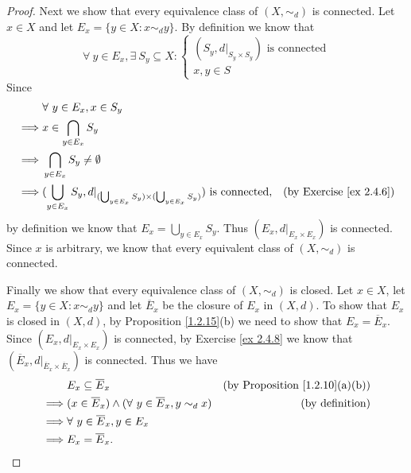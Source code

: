 \begin{proof}
    Next we show that every equivalence class of \((X, \sim_d)\) is connected.
    Let \(x \in X\) and let \(E_x = \{y \in X : x \sim_d y\}\).
    By definition we know that
    \[
        \forall\ y \in E_x, \exists\ S_y \subseteq X : \begin{cases}
            (S_y, d|_{S_y \times S_y}) \text{ is connected} \\
            x, y \in S
        \end{cases}
    \]
    Since
    \begin{align*}
                 & \forall\ y \in E_x, x \in S_y                                                                                                                          \\
        \implies & x \in \bigcap_{y \in E_x} S_y                                                                                                                          \\
        \implies & \bigcap_{y \in E_x} S_y \neq \emptyset                                                                                                                 \\
        \implies & (\bigcup_{y \in E_x} S_y, d|_{(\bigcup_{y \in E_x} S_y) \times (\bigcup_{y \in E_x} S_y)}) \text{ is connected}, & \text{(by Exercise \ref{ex 2.4.6})}
    \end{align*}
    by definition we know that \(E_x = \bigcup_{y \in E_x} S_y\).
    Thus \((E_x, d|_{E_x \times E_x})\) is connected.
    Since \(x\) is arbitrary, we know that every equivalent class of \((X, \sim_d)\) is connected.

    Finally we show that every equivalence class of \((X, \sim_d)\) is closed.
    Let \(x \in X\), let \(E_x = \{y \in X : x \sim_d y\}\) and let \(\overline{E}_x\) be the closure of \(E_x\) in \((X, d)\).
    To show that \(E_x\) is closed in \((X, d)\), by Proposition \ref{1.2.15}(b) we need to show that \(E_x = \overline{E}_x\).
    Since \((E_x, d|_{E_x \times E_x})\) is connected, by Exercise \ref{ex 2.4.8} we know that \((\overline{E}_x, d|_{\overline{E}_x \times \overline{E}_x})\) is connected.
    Thus we have
    \begin{align*}
                 & E_x \subseteq \overline{E}_x                                             & \text{(by Proposition \ref{1.2.10}(a)(b))} \\
        \implies & (x \in \overline{E}_x) \land (\forall\ y \in \overline{E}_x, y \sim_d x) & \text{(by definition)}                     \\
        \implies & \forall\ y \in \overline{E}_x, y \in E_x                                                                              \\
        \implies & E_x = \overline{E}_x.
    \end{align*}
\end{proof}

